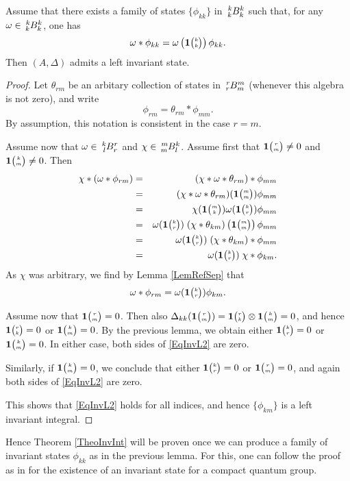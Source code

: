 \begin{Lem} Assume that there exists a family of states $\{\phi_{kk}\}$ in $\Gr{B}{k}{k}{k}{k}$ such that, for any $\omega \in \Gr{B}{k}{k}{k}{k}$, one has \[\omega*\phi_{kk} = \omega\left(\mathbf{1}{\tiny {\begin{pmatrix} k\\k\end{pmatrix}}}\right)\phi_{kk}.\] Then $(A,\Delta)$ admits a left invariant state.
\end{Lem}
\begin{proof} Let $\theta_{rm}$ be an arbitary collection of states in $\Gr{B}{r}{m}{r}{m}$ (whenever this algebra is not zero), and write \[\phi_{rm} = \theta_{rm}*\phi_{mm}.\] By assumption, this notation is consistent in the case $r=m$. 

Assume now that $\omega \in \Gr{B}{k}{r}{l}{r}$ and $\chi \in \Gr{B}{m}{k}{m}{l}$. Assume first that $\mathbf{1}{\tiny {\begin{pmatrix} r\\m\end{pmatrix}}}\neq 0$ and $\mathbf{1}{\tiny {\begin{pmatrix} k\\m\end{pmatrix}}}\neq 0$. Then \begin{eqnarray*} \chi*(\omega*\phi_{rm}) &=& (\chi*\omega*\theta_{rm})*\phi_{mm} \\ &=&  (\chi*\omega*\theta_{rm})(\mathbf{1}{\tiny {\begin{pmatrix} m\\m\end{pmatrix}}}) \phi_{mm} \\ &=&  \chi(\mathbf{1}{\tiny {\begin{pmatrix} m\\k\end{pmatrix}}})\omega(\mathbf{1}{\tiny {\begin{pmatrix} k\\r\end{pmatrix}}})\phi_{mm} \\ &=&  \omega(\mathbf{1}{\tiny {\begin{pmatrix} k\\r\end{pmatrix}}}) \; (\chi*\theta_{km})\left(\mathbf{1}{\tiny {\begin{pmatrix} m\\m\end{pmatrix}}}\right)\phi_{mm}
\\ &=& \omega(\mathbf{1}{\tiny {\begin{pmatrix} k\\r\end{pmatrix}}}) \; (\chi*\theta_{km})*\phi_{mm} \\ &=&  \omega(\mathbf{1}{\tiny {\begin{pmatrix} k\\r\end{pmatrix}}}) \; \chi*\phi_{km} .\end{eqnarray*} As $\chi$ was arbitrary, we find by Lemma \ref{LemRefSep} that \begin{equation}\label{EqInvL2} \omega*\phi_{rm} =  \omega(\mathbf{1}{\tiny {\begin{pmatrix} k\\r\end{pmatrix}}}) \phi_{km}.\end{equation}

Assume now that $\mathbf{1}{\tiny {\begin{pmatrix} r\\m\end{pmatrix}}}=0$. Then also $\Delta_{kk}(\mathbf{1}{\tiny {\begin{pmatrix} r\\m\end{pmatrix}}}) = \mathbf{1}{\tiny {\begin{pmatrix} r\\k\end{pmatrix}}}\otimes \mathbf{1}{\tiny {\begin{pmatrix} k\\m\end{pmatrix}}}=0$, and hence $\mathbf{1}{\tiny {\begin{pmatrix} r\\k\end{pmatrix}}}=0$ or $\mathbf{1}{\tiny {\begin{pmatrix} k\\m\end{pmatrix}}}=0$. By the previous lemma, we obtain either $\mathbf{1}{\tiny {\begin{pmatrix} k\\r\end{pmatrix}}}=0$ or $\mathbf{1}{\tiny {\begin{pmatrix} k\\m\end{pmatrix}}}=0$. In either case, both sides of \eqref{EqInvL2} are zero. 

Similarly, if $\mathbf{1}{\tiny {\begin{pmatrix} k\\m\end{pmatrix}}}=0$, we conclude that either $\mathbf{1}{\tiny {\begin{pmatrix} k\\r\end{pmatrix}}}=0$ or $\mathbf{1}{\tiny {\begin{pmatrix} r\\m\end{pmatrix}}}=0$, and again both sides of \eqref{EqInvL2} are zero.

This shows that \eqref{EqInvL2} holds for all indices, and hence $\{\phi_{km}\}$ is a left invariant integral. 
\end{proof} 

Hence Theorem \ref{TheoInvInt} will be proven once we can produce a family of invariant states $\phi_{kk}$ as in the previous lemma. For this, one can follow the proof as in \cite{MVD1} for the existence of an invariant state for a compact quantum group.

